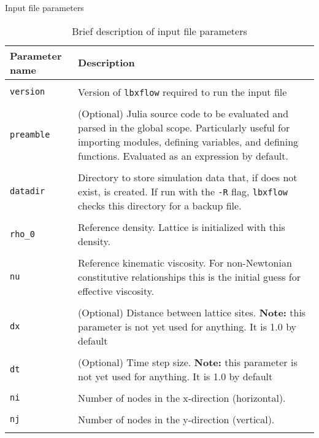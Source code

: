 \documentclass[pdf]{beamer}
\begin{document}
\begin{frame}{Input file parameters}
\begin{table}
    \tiny
    \centering
    \caption{Brief description of input file parameters}
    \begin{tabularx}{\textwidth}{l X}
      \textbf{Parameter name} & \textbf{Description} \\
      \hline \\
      \texttt{version} & Version of \texttt{lbxflow} required to run the input file \\
      \\
      \texttt{preamble} & (Optional) Julia source code to be evaluated and parsed in the global scope. Particularly useful for importing modules, defining variables, and defining functions. Evaluated as an expression by default. \\
      \\
      \texttt{datadir} & Directory to store simulation data that, if does not exist, is created. If run with the \texttt{-R} flag, \texttt{lbxflow} checks this directory for a backup file. \\
      \\
      \texttt{rho\_0} & Reference density. Lattice is initialized with this density. \\
      \\
      \texttt{nu} & Reference kinematic viscosity. For non-Newtonian constitutive relationships this is the initial guess for effective viscosity. \\
      \\
      \texttt{dx} & (Optional) Distance between lattice sites. \textbf{Note:} this parameter is not yet used for anything. It is 1.0 by default\\
      \\
      \texttt{dt} & (Optional) Time step size. \textbf{Note:} this parameter is not yet used for anything. It is 1.0 by default\\
      \\
      \texttt{ni} & Number of nodes in the x-direction (horizontal). \\
      \\
      \texttt{nj} & Number of nodes in the y-direction (vertical). \\
      \\
    \end{tabularx}
  \end{table}
\end{frame}
\end{document}
